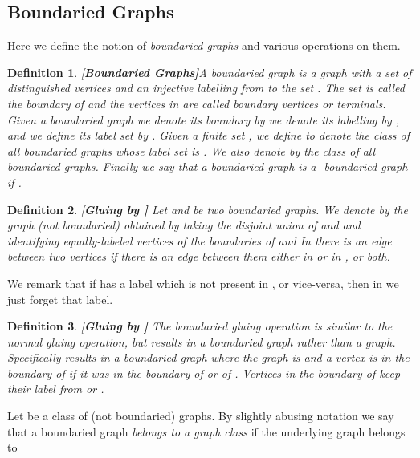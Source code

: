 \documentclass[11pt]{article}
\newtheorem{definition}{Definition}
\newcommand{\term}[1]{#1}
\begin{document}
\subsection{Boundaried Graphs} 
\label{subsec:boungrap}
Here we define the notion of {\em boundaried graphs} and various operations on them.
\begin{definition}{\rm [\bf Boundaried Graphs]}\label{def:boungraph}
A \term{boundaried graph} is a graph  with a set  
of  distinguished vertices and an injective labelling  
from   to the set . The set  is called the \term{{\em boundary}} of  and  the vertices in   are called  {\em boundary vertices} or \term{{\em terminals}}. 
Given a boundaried graph  we denote its boundary by 
we denote its labelling by , 
and we define its {\em label set} by .
Given a finite set , we define 
  to denote the class of all boundaried graphs whose label set is . 
We also denote by  the class of all boundaried graphs.
Finally we say that a boundaried graph is a {\em -boundaried} graph if .
\end{definition}





\begin{definition}{\rm [\bf Gluing by ]} Let  and  be two  boundaried graphs. We denote by  the  graph 
(not boundaried) obtained by taking the disjoint union of  and  and identifying equally-labeled vertices of the boundaries of  and  In  there is an edge between two vertices if there is  an edge between them either in  or in , or both.  
\end{definition}

We remark that if  has a label which is not present in , or vice-versa, then in  we just forget that label. 

\begin{definition} {\rm [\bf Gluing by ]}
The {\em boundaried gluing operation}  is similar to the normal gluing operation, but results in a boundaried graph rather than a graph. Specifically  results in a boundaried graph where the graph is  and a vertex is in the boundary of  if it was in the boundary of  or  of . Vertices in the boundary of  keep their label from  or . 
\end{definition}





Let  be a class of (not boundaried)  graphs.
By slightly abusing notation we say that a boundaried graph {\em belongs to a graph class } if the underlying graph belongs to 
\end{document}
